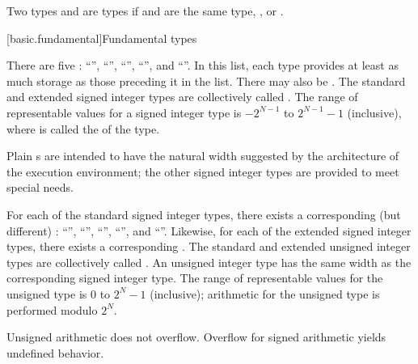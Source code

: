 \pnum
{}%
Two types   and   are
 types
if  and  are the same type,
, or
.

[basic.fundamental]{Fundamental types}

\pnum
{}%
There are five :
%
%
%
%
%
``'', ``'', ``'',
``'', and ``''. In
this list, each type provides at least as much storage as those
preceding it in the list.
There may also be 
.
The standard and extended signed integer types are collectively called
.
The range of representable values for a signed integer type is
$-2^{N-1}$ to $2^{N-1}-1$ (inclusive),
where  is called the  of the type.
%
\begin{note}
Plain s are intended to have
the natural width suggested by the architecture of the execution environment;
the other signed integer types are provided to meet special needs.
\end{note}

\pnum
{}%
For each of the standard signed integer types,
there exists a corresponding (but different)
:
%
%
%
%
%
``'', ``'',
``'', ``'', and
``''.
Likewise, for each of the extended signed integer types,
there exists a corresponding .
The standard and extended unsigned integer types
are collectively called .
An unsigned integer type has the same width 
as the corresponding signed integer type.
%
The range of representable values for the unsigned type is
$0$ to $2^N-1$ (inclusive);
arithmetic for the unsigned type is performed modulo $2^N$.
\begin{note}
Unsigned arithmetic does not overflow.
Overflow for signed arithmetic yields undefined behavior.
\end{note}

